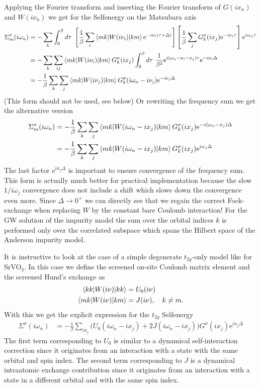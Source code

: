 \documentclass[12pt,a4paper]{scrartcl}
\numberwithin{equation}{section}
\begin{document}
Applying the Fourier transform and inserting the 
Fourier transform of $G(ix_n)$ and $W(i\nu_n)$ we get for the
Selfenergy on the Matsubara axis
\begin{align}
  \Sigma_m^{\sigma}(i\omega_n) 
  &= -\sum_k\int_{0}^{\beta}d\tau \ 
  \left[\frac{1}{\beta}\sum_i \braket{m k | W(i\nu_i)|k m} \mathrm{e}^{-i\nu_i(\tau+\Delta)} \right]
  \left[\frac{1}{\beta}\sum_j G^{\sigma}_{k}(ix_j) \mathrm{e}^{-i\nu_i\tau} \right]
  \mathrm{e}^{i\omega_n\tau} \\
  &= -\sum_k \sum_{ij} \braket{m k | W(i\nu_i)|k m}G^{\sigma}_{k}(ix_j)
    \int_{0}^{\beta}d\tau \ 
  \frac{1}{\beta^2}  \mathrm{e}^{i(\omega_n -\nu_i -x_j)\tau}
   \mathrm{e}^{-i\nu_i \Delta} \\
   &= -\frac{1}{\beta}\sum_k \sum_{j}
   \braket{m k | W(i\nu_j)|k m}G^{\sigma}_{k}(i\omega_n-i\nu_j)
   \mathrm{e}^{-i\nu_j \Delta}
\end{align}
(This form should not be used, see below)
Or rewriting the frequency sum we get the alternative version
\begin{align}
  \Sigma_m^{\sigma}(i\omega_n) 
   &= -\frac{1}{\beta}\sum_k \sum_{j}
   \braket{m k | W(i\omega_n- ix_j )|k m}G^{\sigma}_{k}(ix_j)
   \mathrm{e}^{-i(\omega_n- x_j )\Delta} \\
   &= -\frac{1}{\beta}\sum_k \sum_{j}
   \braket{m k | W(i\omega_n- ix_j )|k m}G^{\sigma}_{k}(ix_j)
   \mathrm{e}^{ix_j \Delta}
\end{align}
The last factor $\mathrm{e}^{ix_j \Delta}$ is important
to ensure convergence of the frequency sum. 
This form is actually much better for practical implementation because
the slow $1/i\omega_j$ convergence does not include a shift which
slows down the convergence even more. 
Since $\Delta\rightarrow 0^+$ we can directly see
that we regain the correct Fock-exchange when replacing
$W$ by the constant bare Coulomb interaction!
For the GW solution of the impurity model 
the sum over the orbital indices $k$ is performed
only over the correlated subspace which spans
the Hilbert space of the Anderson impurity model.


It is instructive to look at the case of a simple
degenerate $t_{2g}$-only model like for SrVO$_3$. In this case
we define the screened on-site Coulomb matrix element and the 
screened Hund's exchange as
\begin{align}
 \braket{k k | W(i\nu )|k k} &= U_0(i\nu) \\
 \braket{m k | W(i\nu )|k m} &= J(i\nu), \ \ \ k\neq m.
\end{align}
With this we get the explicit expression for
the $t_{2g}$ Selfenergy
\begin{align}
  \Sigma^{\sigma}(i\omega_n) 
   &= -\frac{1}{\beta}\sum_{ix_j}
   \Big( U_0(i\omega_n- ix_j )  + 2 J(i\omega_n- ix_j ) \Big)G^{\sigma}(ix_j)
   \mathrm{e}^{ix_j \Delta}
\end{align}
The first term corresponding to 
$U_0$ is similar to a dynamical self-interaction correction since it 
originates from an interaction with a state with the
same orbital and spin index.
The second term corresponding to $J$ is a dynamical
intraatomic exchange contribution
since it 
originates from an interaction with a state in a different
orbital and with the same spin index.
\end{document}
